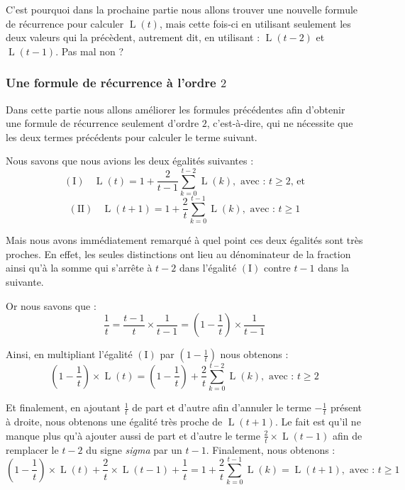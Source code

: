 \documentclass[a4paper,francais,11pt]{article}
\begin{document}
C'est pourquoi dans la prochaine partie nous allons trouver une nouvelle formule de récurrence pour calculer $\operatorname{L}\left(t\right)$, mais cette fois-ci en utilisant seulement les deux valeurs qui la précèdent, autrement dit, en utilisant : $\operatorname{L}\left(t-2\right)$ et $\operatorname{L}\left(t-1\right)$. Pas mal non ?
\subsubsection{Une formule de récurrence à l'ordre $2$}
Dans cette partie nous allons améliorer les formules précédentes afin d'obtenir une formule de récurrence seulement d'ordre $2$, c'est-à-dire, qui ne nécessite que les deux termes précédents pour calculer le terme suivant.

Nous savons que nous avions les deux égalités suivantes :
\[\left(\text{I}\right)\ \ \ \ \operatorname{L}\left(t\right)=1+\frac{2}{t-1}\sum_{k=0}^{t-2}\operatorname{L}\left(k\right),\text{ avec : $t\geqslant2$, et}\]
\[\left(\text{II}\right)\ \ \ \ \operatorname{L}\left(t+1\right)=1+\frac{2}{t}\sum_{k=0}^{t-1}\operatorname{L}\left(k\right),\text{ avec : $t\geqslant1$}\]

Mais nous avons immédiatement remarqué à quel point ces deux égalités sont très proches. En effet, les seules distinctions ont lieu au dénominateur de la fraction ainsi qu'à la somme qui s'arrête à $t-2$ dans l'égalité $\left(\text{I}\right)$ contre $t-1$ dans la suivante. 

Or nous savons que :
\[\frac{1}{t}=\frac{t-1}{t}\times\frac{1}{t-1}=\left(1-\frac{1}{t}\right)\times\frac{1}{t-1}\]

Ainsi, en multipliant l'égalité $\left(\text{I}\right)$ par $\left(1-\frac{1}{t}\right)$ nous obtenons :
\[\left(1-\frac{1}{t}\right)\times\operatorname{L}\left(t\right)=\left(1-\frac{1}{t}\right)+\frac{2}{t}\sum_{k=0}^{t-2}\operatorname{L}\left(k\right),\text{ avec : $t\geqslant2$}\]

Et finalement, en ajoutant $\frac{1}{t}$ de part et d'autre afin d'annuler le terme $-\frac{1}{t}$ présent à droite, nous obtenons une égalité très proche de $\operatorname{L}\left(t+1\right)$. Le fait est qu'il ne manque plus qu'à ajouter aussi de part et d'autre le terme $\frac{2}{t}\times\operatorname{L}\left(t-1\right)$ afin de remplacer le $t-2$ du signe \emph{sigma} par un $t-1$. Finalement, nous obtenons :
\[\left(1-\frac{1}{t}\right)\times\operatorname{L}\left(t\right)+\frac{2}{t}\times\operatorname{L}\left(t-1\right)+\frac{1}{t}=1+\frac{2}{t}\sum_{k=0}^{t-1}\operatorname{L}\left(k\right)=\operatorname{L}\left(t+1\right),\text{ avec : $t\geqslant1$}\]
\end{document}
